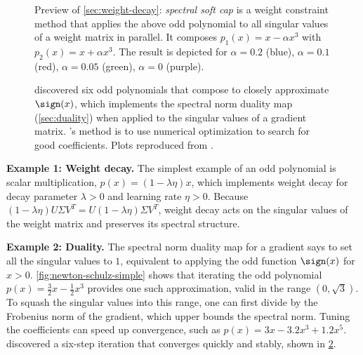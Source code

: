 \begin{figure}[t]
    \centering
    
    \caption{Preview of \cref{sec:weight-decay}: \textit{spectral soft cap} is a weight constraint method that applies the above odd polynomial to all singular values of a weight matrix in parallel. It composes $p_1(x) = x - \alpha x^3$ with $p_2(x) = x + \alpha x^3$. The result is depicted for $\alpha = 0.2$ (blue), $\alpha = 0.1$ (red), $\alpha = 0.05$ (green), $\alpha = 0$ (purple).}
    \label{fig:odd-poly-family}
\end{figure}


\begin{figure}[htbp]
    \centering
    \subfloat{
        
    }
    \hspace{0.03\textwidth}
    \subfloat{
        
    }
    \caption{\citet{You2025} discovered six odd polynomials that compose to closely approximate $\sign(x)$, which implements the spectral norm duality map (\cref{sec:duality}) when applied to the singular values of a gradient matrix. \citet{You2025}'s method is to use numerical optimization to search for good coefficients. Plots reproduced from \citet{modula-docs}.} %
    \label{fig:newton-schulz-jiacheng}
\end{figure}

\textbf{Example 1: Weight decay.} The simplest example of an odd polynomial is scalar multiplication, $p(x) = (1 - \lambda \eta)x$, which implements weight decay for decay parameter $\lambda > 0$ and learning rate $\eta > 0$. Because $(1 - \lambda \eta) U \Sigma V^T = U (1-\lambda \eta) \Sigma V^T$, weight decay acts on the singular values of the weight matrix and preserves its spectral structure.

\textbf{Example 2: Duality.} The spectral norm duality map for a gradient says to set all the singular values to $1$, equivalent to applying the odd function $\sign(x)$ for $x > 0$. \cref{fig:newton-schulz-simple} shows that iterating the odd polynomial $p(x) = \tfrac32 x - \tfrac12 x^3$ provides one such approximation, valid in the range $(0, \sqrt{3})$. To squash the singular values into this range, one can first divide by the Frobenius norm of the gradient, which upper bounds the spectral norm. Tuning the coefficients can speed up convergence, such as $p(x) = 3x - 3.2x^3 + 1.2x^5$. \citet{You2025} discovered a six-step iteration that converges quickly and stably, shown in \cref{fig:newton-schulz-jiacheng}.

